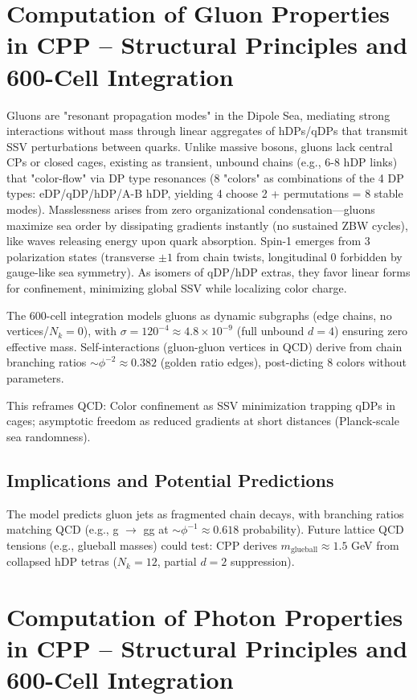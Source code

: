 \documentclass{article}
\begin{document}
\section{Computation of Gluon Properties in CPP -- Structural Principles and 600-Cell Integration}

Gluons are "resonant propagation modes" in the Dipole Sea, mediating strong interactions without mass through linear aggregates of hDPs/qDPs that transmit SSV perturbations between quarks. Unlike massive bosons, gluons lack central CPs or closed cages, existing as transient, unbound chains (e.g., 6-8 hDP links) that "color-flow" via DP type resonances (8 "colors" as combinations of the 4 DP types: eDP/qDP/hDP/A-B hDP, yielding 4 choose 2 + permutations = 8 stable modes). Masslessness arises from zero organizational condensation—gluons maximize sea order by dissipating gradients instantly (no sustained ZBW cycles), like waves releasing energy upon quark absorption. Spin-1 emerges from 3 polarization states (transverse $\pm1$ from chain twists, longitudinal 0 forbidden by gauge-like sea symmetry). As isomers of qDP/hDP extras, they favor linear forms for confinement, minimizing global SSV while localizing color charge.

The 600-cell integration models gluons as dynamic subgraphs (edge chains, no vertices/$N_k=0$), with $\sigma=120^{-4} \approx 4.8 \times 10^{-9}$ (full unbound $d=4$) ensuring zero effective mass. Self-interactions (gluon-gluon vertices in QCD) derive from chain branching ratios $\sim\phi^{-2} \approx 0.382$ (golden ratio edges), post-dicting 8 colors without parameters.

This reframes QCD: Color confinement as SSV minimization trapping qDPs in cages; asymptotic freedom as reduced gradients at short distances (Planck-scale sea randomness).

\subsection{Implications and Potential Predictions}

The model predicts gluon jets as fragmented chain decays, with branching ratios matching QCD (e.g., g $\to$ gg at $\sim\phi^{-1} \approx 0.618$ probability). Future lattice QCD tensions (e.g., glueball masses) could test: CPP derives $m_{\text{glueball}} \approx 1.5$ GeV from collapsed hDP tetras ($N_k=12$, partial $d=2$ suppression).

\section{Computation of Photon Properties in CPP -- Structural Principles and 600-Cell Integration}
\end{document}

